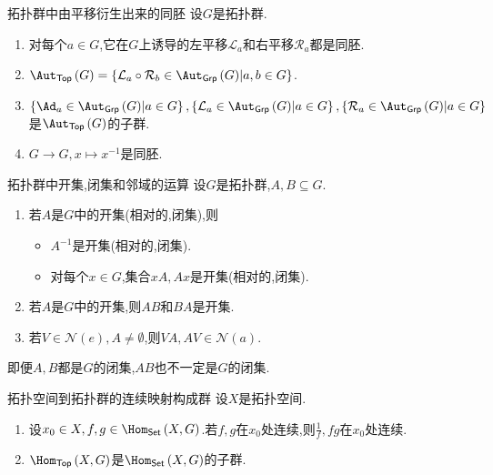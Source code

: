 \begin{proposition}{拓扑群中由平移衍生出来的同胚}{}
	设$G$是拓扑群.
	\begin{enumerate}
		\item 对每个$a\in G$,它在$G$上诱导的左平移$\mathcal{L}_{a}$和右平移$\mathcal{R}_{a}$都是同胚.
		\item $\Aut_{\mathsf{Top}}\left(G\right)=\left\{\mathcal{L}_{a}\circ\mathcal{R}_{b}\in\Aut_{\mathsf{Grp}}\left(G\right)\middle|a,b\in G\right\}$.
		\item $\left\{\Ad_{a}\in\Aut_{\mathsf{Grp}}\left(G\right)\middle|a\in G\right\},\left\{\mathcal{L}_{a}\in\Aut_{\mathsf{Grp}}\left(G\right)\middle|a\in G\right\},\left\{\mathcal{R}_{a}\in\Aut_{\mathsf{Grp}}\left(G\right)\middle|a\in G\right\}$是$\Aut_{\mathsf{Top}}\left(G\right)$的子群.
		\item $G\to G,x\mapsto x^{-1}$是同胚.
	\end{enumerate}
\end{proposition}

\begin{proposition}{拓扑群中开集,闭集和邻域的运算}{}
	设$G$是拓扑群,$A,B\subseteq G$.
	\begin{enumerate}
		\item 若$A$是$G$中的开集(相对的,闭集),则
		\begin{itemize}
			\item $A^{-1}$是开集(相对的,闭集).
			\item 对每个$x\in G$,集合$xA,Ax$是开集(相对的,闭集).
		\end{itemize}
		\item 若$A$是$G$中的开集,则$AB$和$BA$是开集.
		\item 若$V\in\mathcal{N}\left(e\right),A\neq\emptyset$,则$VA,AV\in\mathcal{N}\left(a\right)$.
	\end{enumerate}
\end{proposition}

\begin{remark}{}{}
	即便$A,B$都是$G$的闭集,$AB$也不一定是$G$的闭集.
\end{remark}

\begin{proposition}{拓扑空间到拓扑群的连续映射构成群}{}
	设$X$是拓扑空间.
	\begin{enumerate}
		\item 设$x_{0}\in X,f,g\in\Hom_{\mathsf{Set}}\left(X,G\right)$.若$f,g$在$x_{0}$处连续,则$\frac{1}{f},fg$在$x_{0}$处连续.
		\item $\Hom_{\mathsf{Top}}\left(X,G\right)$是$\Hom_{\mathsf{Set}}\left(X,G\right)$的子群.
	\end{enumerate}
\end{proposition}

